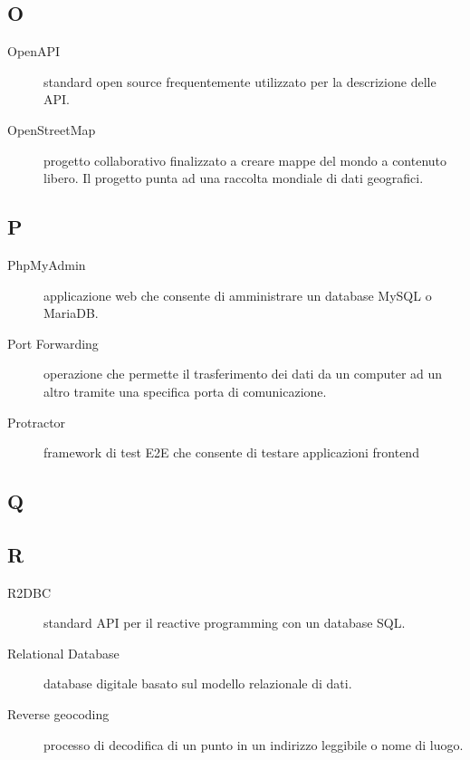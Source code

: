 \documentclass[../manuale-manutentore.tex]{subfiles}
\begin{document}
\subsection{O}

\begin{description}
    \item[OpenAPI] standard open source frequentemente utilizzato per la descrizione delle API\@.
    \item[OpenStreetMap] progetto collaborativo finalizzato a creare mappe del mondo a contenuto libero. Il progetto punta ad una raccolta mondiale di dati geografici.
\end{description}

\subsection{P}

\begin{description}
    \item[PhpMyAdmin] applicazione web che consente di amministrare un database MySQL o MariaDB\@.
    \item[Port Forwarding] operazione che permette il trasferimento dei dati da un computer ad un altro tramite una specifica porta di comunicazione.
    \item[Protractor] framework di test E2E che consente di testare applicazioni frontend
\end{description}

\subsection{Q}

\subsection{R}

\begin{description}
    \item[R2DBC] standard API per il reactive programming con un database SQL\@.
    \item[Relational Database] database digitale basato sul modello relazionale di dati.
    \item[Reverse geocoding] processo di decodifica di un punto in un indirizzo leggibile o nome di luogo.
\end{description}
\end{document}
